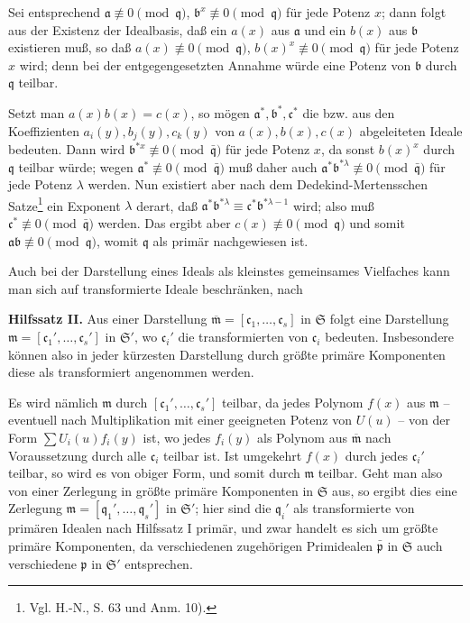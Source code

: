 \documentclass[11pt]{article}
\providecommand{\frakS}{\mathfrak S}
\providecommand{\frakm}{\mathfrak m}
\providecommand{\frakp}{\mathfrak p}
\providecommand{\frakq}{\mathfrak q}
\providecommand{\fraka}{\mathfrak a}
\providecommand{\frakb}{\mathfrak b}
\providecommand{\frakc}{\mathfrak c}
\providecommand{\frakb}{\mathfrak b}
\providecommand{\frakc}{\mathfrak c}
\providecommand{\barfrakm}{\overline{\mathfrak m}}
\begin{document}
Sei entsprechend $\fraka\not\equiv0\pmod{\frakq}$, $\frakb^x\not\equiv0\pmod{\frakq}$ für jede Potenz $x$; dann folgt aus der Existenz der Idealbasis, daß ein $a(x)$ aus $\fraka$ und ein $b(x)$ aus $\frakb$ existieren muß, so daß $a(x)\not\equiv0\pmod{\frakq}$, $b(x)^x\not\equiv0\pmod{\frakq}$ für jede Potenz $x$ wird; denn bei der entgegengesetzten Annahme würde eine Potenz von $\frakb$ durch $\frakq$ teilbar.

Setzt man $a(x)b(x)=c(x)$, so mögen $\fraka^*,\frakb^*,\frakc^*$ die bzw. aus den Koeffizienten $a_i(y),b_j(y),c_k(y)$ von $a(x),b(x),c(x)$ abgeleiteten Ideale bedeuten. Dann wird $\frakb^{*x}\not\equiv0\pmod{\bar{\frakq}}$ für jede Potenz $x$, da sonst $b(x)^x$ durch $\frakq$ teilbar würde; wegen $\fraka^*\not\equiv0\pmod{\bar{\frakq}}$ muß daher auch $\fraka^*\frakb^{*\lambda}\not\equiv0\pmod{\bar{\frakq}}$ für jede Potenz $\lambda$ werden. Nun existiert aber nach dem Dedekind-Mertensschen Satze\footnote{Vgl. H.-N., S. 63 und Anm. 10).} ein Exponent $\lambda$ derart, daß $\fraka^*\frakb^{*\lambda}\equiv \frakc^*\frakb^{*\lambda-1}$ wird; also muß $\frakc^*\not\equiv0\pmod{\bar{\frakq}}$ werden. Das ergibt aber $c(x)\not\equiv0\pmod{\frakq}$ und somit $\fraka\frakb\not\equiv0\pmod{\frakq}$, womit $\frakq$ als primär nachgewiesen ist.

Auch bei der Darstellung eines Ideals als kleinstes gemeinsames Vielfaches kann man sich auf transformierte Ideale beschränken, nach

\textbf{Hilfssatz II.} Aus einer Darstellung $\barfrakm=[\frakc_1,\ldots,\frakc_s]$ in $\frakS$ folgt eine Darstellung $\frakm=[\frakc_1',\ldots,\frakc_s']$ in $\frakS'$, wo $\frakc_i'$ die transformierten von $\frakc_i$ bedeuten. Insbesondere können also in jeder kürzesten Darstellung durch größte primäre Komponenten diese als transformiert angenommen werden.

Es wird nämlich $\frakm$ durch $[\frakc_1',\ldots,\frakc_s']$ teilbar, da jedes Polynom $f(x)$ aus $\frakm$ -- eventuell nach Multiplikation mit einer geeigneten Potenz von $U(u)$ -- von der Form $\sum U_i(u)f_i(y)$ ist, wo jedes $f_i(y)$ als Polynom aus $\barfrakm$ nach Voraussetzung durch alle $\frakc_i$ teilbar ist. Ist umgekehrt $f(x)$ durch jedes $\frakc_i'$ teilbar, so wird es von obiger Form, und somit durch $\frakm$ teilbar. Geht man also von einer Zerlegung in größte primäre Komponenten in $\frakS$ aus, so ergibt dies eine Zerlegung $\frakm=[\frakq_1',\ldots,\frakq_s']$ in $\frakS'$; hier sind die $\frakq_i'$ als transformierte von primären Idealen nach Hilfssatz I primär, und zwar handelt es sich um größte primäre Komponenten, da verschiedenen zugehörigen Primidealen $\bar{\frakp}$ in $\frakS$ auch verschiedene $\frakp$ in $\frakS'$ entsprechen.
\end{document}
